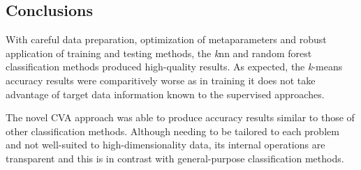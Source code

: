 \documentclass[12pt]{article}
\begin{document}
\subsection*{Conclusions}

With careful data preparation, optimization of metaparameters and robust application of training and testing methods, 
the \textit{k}nn and random forest classification methods produced high-quality results. 
As expected, the \textit{k}-means accuracy results were comparitively worse
as in training it does not take advantage of target data information known to the supervised approaches. 

The novel CVA approach was able to produce accuracy results
similar to those of other classification methods. 
Although needing to be tailored to each problem and not well-suited to high-dimensionality data, 
its internal operations are transparent and this is in contrast with general-purpose classification methods. 


\printbibliography
\end{document}
